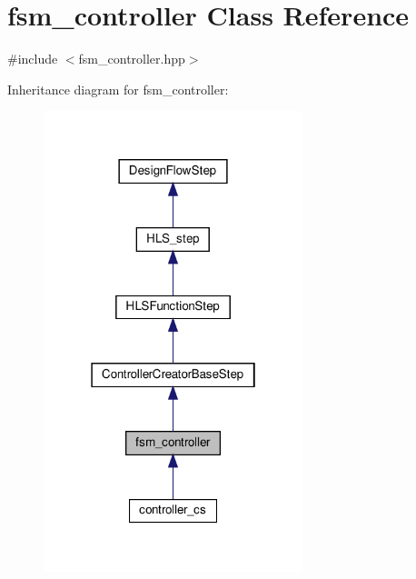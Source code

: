 \hypertarget{classfsm__controller}{}\section{fsm\+\_\+controller Class Reference}
\label{classfsm__controller}


{\ttfamily \#include $<$fsm\+\_\+controller.\+hpp$>$}



Inheritance diagram for fsm\+\_\+controller\+:
\nopagebreak
\begin{figure}[H]
\begin{center}
\leavevmode
\includegraphics[width=214pt]{d7/dc2/classfsm__controller__inherit__graph}
\end{center}
\end{figure}


